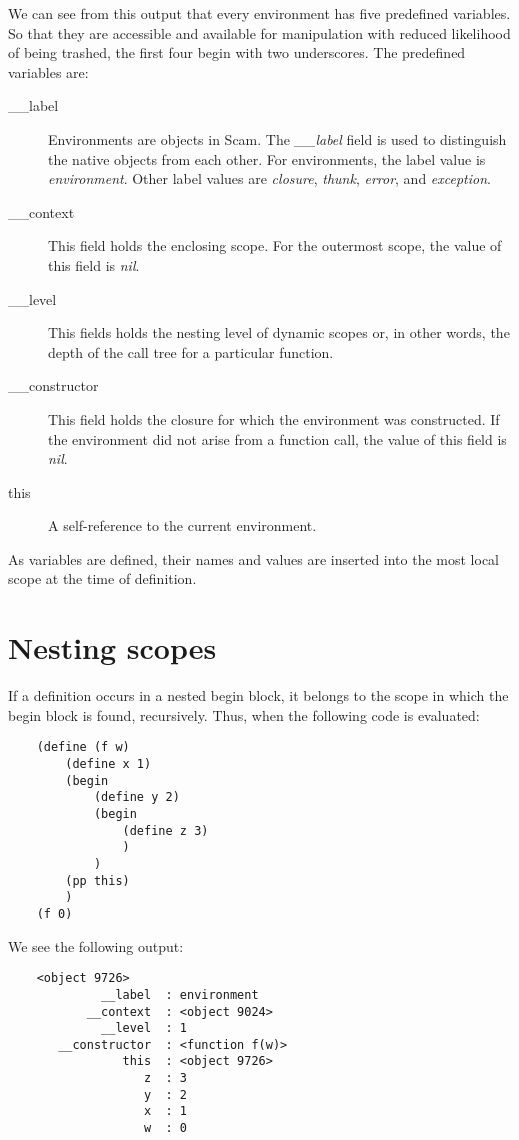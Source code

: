 We can see from this output that every environment
has five predefined variables. So that they are accessible
and available for manipulation with reduced
likelihood of being trashed, the first four begin with
two underscores. The predefined variables are:

\begin{description}
\item[\_\_label]
    Environments are objects in Scam.
    The {\it \_\_label} field is used to distinguish the native objects from
    each other. For environments, the label value is {\it environment}.
    Other label values are {\it closure}, {\it thunk}, {\it error},
    and {\it exception}.
\item[\_\_context]
    This field holds the enclosing scope. For the outermost scope,
    the value of this field is {\it nil}.
\item[\_\_level]
    This fields holds the nesting level of dynamic scopes or, in 
    other words, the depth of the call tree for a particular function.
\item[\_\_constructor]
    This field holds the closure for which the environment was constructed.
    If the environment did not arise from a function call, the value of
    this field is {\it nil}.
\item[this]
    A self-reference to the current environment.
\end{description}


As variables are defined, their names and values are inserted
into the most local scope at the time of definition.

\section{Nesting scopes}

If a definition occurs in 
a nested begin block, it belongs to the scope in which the
begin block is found, recursively. Thus, when the following
code is evaluated:

\begin{verbatim}
    (define (f w)
        (define x 1)
        (begin
            (define y 2)
            (begin
                (define z 3)
                )
            )
        (pp this)
        )
    (f 0)
\end{verbatim}

We see the following output:

\begin{verbatim}
    <object 9726>
             __label  : environment
           __context  : <object 9024>
             __level  : 1
       __constructor  : <function f(w)>
                this  : <object 9726>
                   z  : 3
                   y  : 2
                   x  : 1
                   w  : 0
\end{verbatim}

